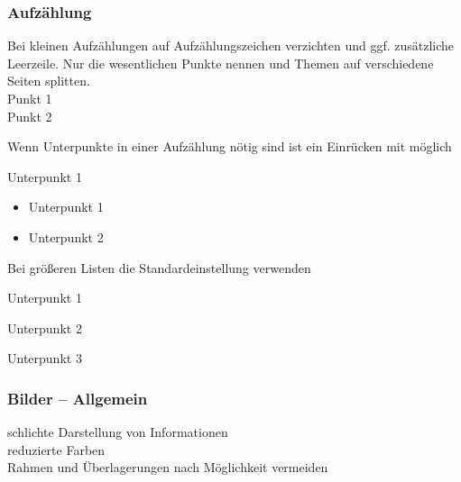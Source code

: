 \begin{frame}
    \frametitle{Aufzählung}
    
Bei kleinen Aufzählungen auf Aufzählungszeichen verzichten und ggf. zusätzliche Leerzeile.\newline
Nur die wesentlichen Punkte nennen und Themen auf verschiedene Seiten splitten.\\
Punkt 1\\
Punkt 2

Wenn Unterpunkte in einer Aufzählung nötig sind ist ein Einrücken mit \PraesentationAufzaehlungEbeneZweiSymbol{} möglich

\begin{PraesentationAufzaehlung}
    \item Unterpunkt 1
        \begin{itemize}
            \item Unterpunkt 1
            \item Unterpunkt 2
        \end{itemize}
\end{PraesentationAufzaehlung}

Bei größeren Listen die Standardeinstellung \PraesentationAufzaehlungEbeneEinsSymbol{} verwenden

\begin{PraesentationAufzaehlung}
    \item Unterpunkt 1
    \item Unterpunkt 2
    \item Unterpunkt 3
\end{PraesentationAufzaehlung}

\end{frame}
\clearpage


\begin{frame}
    \frametitle{Bilder -- Allgemein}
    
schlichte Darstellung von Informationen \\[\baselineskip]

reduzierte Farben \\[\baselineskip]

Rahmen und Überlagerungen nach Möglichkeit vermeiden \\[\baselineskip]

    
\end{frame}
\clearpage


